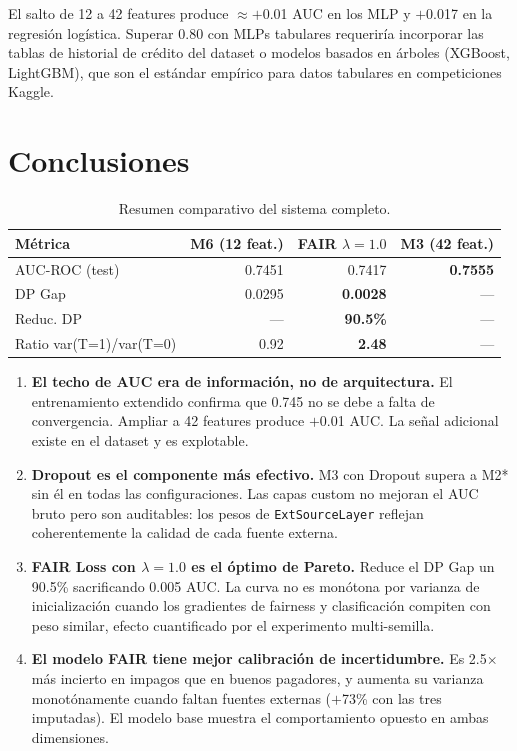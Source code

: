 \documentclass[12pt,a4paper]{article}
\begin{document}
El salto de 12 a 42 features produce $\approx +$0.01 AUC en los MLP y
$+$0.017 en la regresión logística. Superar 0.80 con MLPs tabulares requeriría
incorporar las tablas de historial de crédito del dataset o modelos basados
en árboles (XGBoost, LightGBM), que son el estándar empírico para datos
tabulares en competiciones Kaggle.

\section{Conclusiones}
\label{sec:conclusions}

\begin{table}[H]
\centering
\caption{Resumen comparativo del sistema completo.}
\label{tab:final}
\begin{tabular}{@{}lrrr@{}}
\toprule
\textbf{Métrica} & \textbf{M6 (12 feat.)} & \textbf{FAIR $\lambda=1.0$} & \textbf{M3 (42 feat.)} \\
\midrule
AUC-ROC (test)          & 0.7451 & 0.7417 & \textbf{0.7555} \\
DP Gap                  & 0.0295 & \textbf{0.0028} & --- \\
Reduc. DP               & ---    & \textbf{90.5\%} & --- \\
Ratio var(T=1)/var(T=0) & 0.92   & \textbf{2.48}  & --- \\
\bottomrule
\end{tabular}
\end{table}

\begin{enumerate}[leftmargin=*, label=\textbf{\arabic*.}]
    \item \textbf{El techo de AUC era de información, no de arquitectura.}
    El entrenamiento extendido confirma que 0.745 no se debe a falta de
    convergencia. Ampliar a 42 features produce $+$0.01 AUC. La señal
    adicional existe en el dataset y es explotable.

    \item \textbf{Dropout es el componente más efectivo.}
    M3 con Dropout supera a M2* sin él en todas las configuraciones.
    Las capas custom no mejoran el AUC bruto pero son auditables:
    los pesos de \texttt{ExtSourceLayer} reflejan coherentemente la calidad
    de cada fuente externa.

    \item \textbf{FAIR Loss con $\lambda=1.0$ es el óptimo de Pareto.}
    Reduce el DP Gap un 90.5\% sacrificando 0.005 AUC. La curva no es
    monótona por varianza de inicialización cuando los gradientes de
    fairness y clasificación compiten con peso similar,
    efecto cuantificado por el experimento multi-semilla.

    \item \textbf{El modelo FAIR tiene mejor calibración de incertidumbre.}
    Es 2.5$\times$ más incierto en impagos que en buenos pagadores, y
    aumenta su varianza monotónamente cuando faltan fuentes externas
    ($+$73\% con las tres imputadas). El modelo base muestra el
    comportamiento opuesto en ambas dimensiones.
\end{enumerate}
\end{document}
